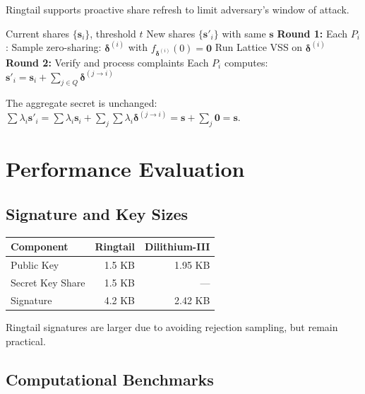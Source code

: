 \documentclass[11pt,a4paper]{article}
\begin{document}
Ringtail supports proactive share refresh to limit adversary's window of attack.

\begin{algorithm}
\caption{Ringtail-Refresh}
\begin{algorithmic}[1]
\Require Current shares $\{\mathbf{s}_i\}$, threshold $t$
\Ensure New shares $\{\mathbf{s}'_i\}$ with same $\mathbf{s}$
\State \textbf{Round 1:} Each $P_i$:
\State \quad Sample zero-sharing: $\boldsymbol{\delta}^{(i)}$ with $f_{\boldsymbol{\delta}^{(i)}}(0) = \mathbf{0}$
\State \quad Run Lattice VSS on $\boldsymbol{\delta}^{(i)}$
\State \textbf{Round 2:} Verify and process complaints
\State Each $P_i$ computes: $\mathbf{s}'_i = \mathbf{s}_i + \sum_{j \in Q} \boldsymbol{\delta}^{(j \to i)}$
\end{algorithmic}
\end{algorithm}

The aggregate secret is unchanged: $\sum \lambda_i \mathbf{s}'_i = \sum \lambda_i \mathbf{s}_i + \sum_j \sum \lambda_i \boldsymbol{\delta}^{(j \to i)} = \mathbf{s} + \sum_j \mathbf{0} = \mathbf{s}$.

\section{Performance Evaluation}

\subsection{Signature and Key Sizes}

\begin{center}
\begin{tabular}{|l|r|r|}
\hline
\textbf{Component} & \textbf{Ringtail} & \textbf{Dilithium-III} \\
\hline
Public Key & 1.5 KB & 1.95 KB \\
Secret Key Share & 1.5 KB & --- \\
Signature & 4.2 KB & 2.42 KB \\
\hline
\end{tabular}
\end{center}

Ringtail signatures are larger due to avoiding rejection sampling, but remain practical.

\subsection{Computational Benchmarks}
\end{document}
